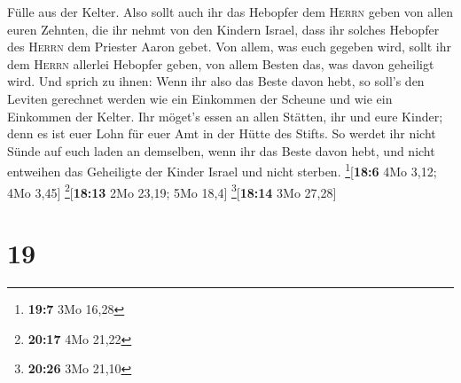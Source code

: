 Fülle aus der Kelter.  Also sollt auch ihr das Hebopfer
dem \textsc{Herrn} geben von allen euren Zehnten, die ihr nehmt von den
Kindern Israel, dass ihr solches Hebopfer des \textsc{Herrn} dem
Priester Aaron gebet.  Von allem, was euch gegeben wird,
sollt ihr dem \textsc{Herrn} allerlei Hebopfer geben, von allem Besten
das, was davon geheiligt wird.  Und sprich zu ihnen: Wenn
ihr also das Beste davon hebt, so soll's den Leviten gerechnet werden
wie ein Einkommen der Scheune und wie ein Einkommen der Kelter.
 Ihr möget's essen an allen Stätten, ihr und eure Kinder;
denn es ist euer Lohn für euer Amt in der Hütte des Stifts.
 So werdet ihr nicht Sünde auf euch laden an demselben,
wenn ihr das Beste davon hebt, und nicht entweihen das Geheiligte der
Kinder Israel und nicht sterben. \footnote{\textbf{19:7} 3Mo 16,28}{[}\textbf{18:6}
4Mo 3,12; 4Mo 3,45{]} \footnote{\textbf{20:17} 4Mo 21,22}{[}\textbf{18:13}
2Mo 23,19; 5Mo 18,4{]} \footnote{\textbf{20:26} 3Mo 21,10}{[}\textbf{18:14}
3Mo 27,28{]}

\hypertarget{section-18}{%
\section{19}\label{section-18}}


